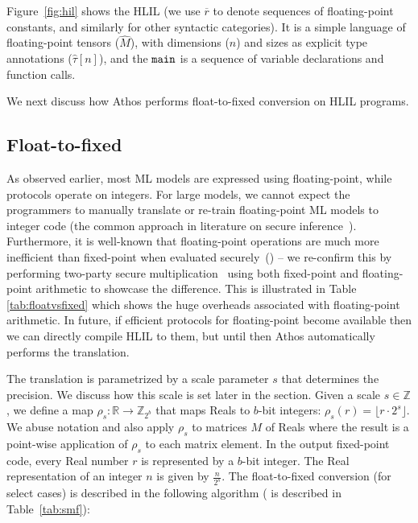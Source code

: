 Figure~\ref{fig:hil} shows the HLIL (we use $\overline{r}$ to denote
sequences of floating-point constants, and similarly for other
syntactic categories). It is a simple language of floating-point
tensors ($\hat{M}$), with dimensions ($n$) and sizes as explicit type annotations ($\hat{\tau}[n]$), and
the ${\mathtt{main}}$ is a sequence of variable declarations and function calls.

We next discuss how Athos performs float-to-fixed conversion on HLIL
programs.

\subsection{Float-to-fixed}
\label{subsec:athosquantizer}
As observed earlier, most ML models are expressed using
floating-point, while \mpc protocols operate on
integers. For large models, we cannot expect the programmers to
manually translate or re-train floating-point ML models to integer
code (the common approach in literature on secure inference~\cite{secureml,minionn,gazelle,aby3,securenn,delphi,chameleon}).
Furthermore, it is well-known that floating-point operations are much
more inefficient than fixed-point when evaluated
securely~(\cite{secureml,aby3}) -- we re-confirm this by performing
two-party secure multiplication~\cite{ddkssz15} using both fixed-point
and floating-point arithmetic to showcase the difference. This is
illustrated in Table \ref{tab:floatvsfixed} which shows the huge
overheads associated with floating-point arithmetic.
In future, if efficient protocols for floating-point become
available then we can directly compile HLIL to them, but until then
Athos automatically performs the translation.

The translation is parametrized by a scale parameter
$s$ that determines the precision.
We discuss how this scale is set later in the section. Given a scale
$s\in\mathbb{Z}$, we define a map $\rho_s:\mathbb{R}\rightarrow \mathbb{Z}_{2^b}$
that maps Reals to $b$-bit integers: $\rho_s(r)=\lfloor r\cdot2^s\rfloor$. We abuse notation and also apply $\rho_s$ to
matrices $M$ of Reals where the result is a point-wise application of
$\rho_s$ to each matrix element.  
In the output fixed-point code, every Real number $r$ is represented by a $b$-bit integer.
The Real representation of an integer $n$ is given by $\frac{n}{2^s}$.
The float-to-fixed conversion (for select cases) is described in
the following algorithm ( is described in
Table~\ref{tab:smf}):


